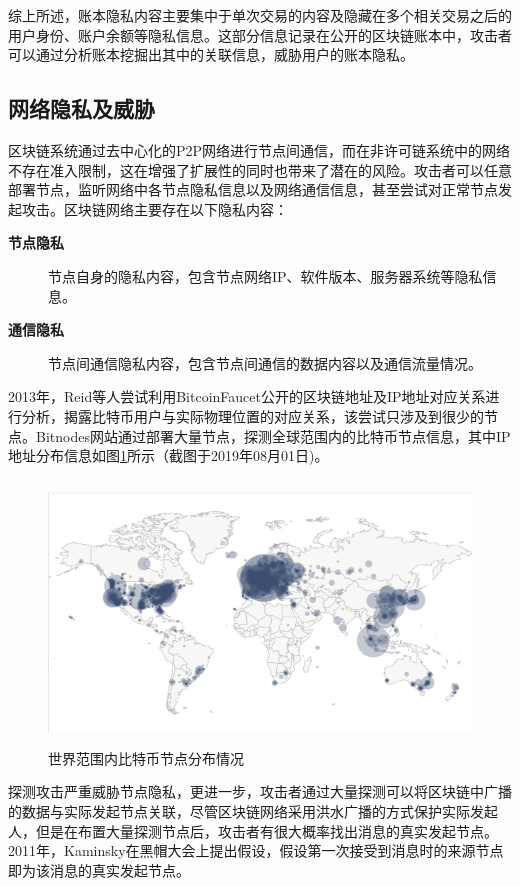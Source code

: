 综上所述，账本隐私内容主要集中于单次交易的内容及隐藏在多个相关交易之后的用户身份、账户余额等隐私信息。这部分信息记录在公开的区块链账本中，攻击者可以通过分析账本挖掘出其中的关联信息，威胁用户的账本隐私。

\subsection{网络隐私及威胁}

区块链系统通过去中心化的P2P网络进行节点间通信，而在非许可链系统中的网络不存在准入限制，这在增强了扩展性的同时也带来了潜在的风险。攻击者可以任意部署节点，监听网络中各节点隐私信息以及网络通信信息，甚至尝试对正常节点发起攻击。区块链网络主要存在以下隐私内容：

\begin{description}
  \item[\textbf{节点隐私}] 节点自身的隐私内容，包含节点网络IP、软件版本、服务器系统等隐私信息。
  \item[\textbf{通信隐私}] 节点间通信隐私内容，包含节点间通信的数据内容以及通信流量情况。
\end{description}

2013年，Reid等人尝试利用BitcoinFaucet公开的区块链地址及IP地址对应关系进行分析，揭露比特币用户与实际物理位置的对应关系，该尝试只涉及到很少的节点。Bitnodes网站通过部署大量节点，探测全球范围内的比特币节点信息，其中IP地址分布信息如图\ref{fig:bitcoin-dis}所示（截图于2019年08月01日)。

\begin{figure}
\centering
\includegraphics[height=7cm]{figures/bitcoin-dis.png}
\caption{世界范围内比特币节点分布情况}
\label{fig:bitcoin-dis}
\end{figure}

探测攻击严重威胁节点隐私，更进一步，攻击者通过大量探测可以将区块链中广播的数据与实际发起节点关联，尽管区块链网络采用洪水广播的方式保护实际发起人，但是在布置大量探测节点后，攻击者有很大概率找出消息的真实发起节点。2011年，Kaminsky在黑帽大会上提出假设，假设第一次接受到消息时的来源节点即为该消息的真实发起节点。

